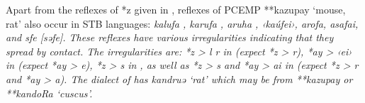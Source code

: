 Apart from the reflexes of *z given in ,
reflexes of PCEMP **kazupay ‘mouse,
rat’ also occur in STB languages:  \it{kalufa} \citep[144]{Collins1986},
\it{karufa} \citep{Stokhof1982b},  \it{aruha} \citep{Visser2019a},
 ‹kaúfei›,  \it{arofa,}  \it{asafai},
and  \it{sfe} [səfe].
These reflexes have various irregularities indicating that they spread by contact.
The irregularities are: *z > \it{l {\tl} r} in  (expect
*z > \it{r}), *ay > ‹ei› in  (expect *ay > \it{e}),
*z > s in ,
as well as *z > \it{s}
and *ay > \it{ai} in  (expect *z > \it{r}
and *ay > \it{a}).
The  dialect of  has \it{kandruə} ‘rat’ which may
be from **kazupay or **kandoRa ‘cuscus’.


